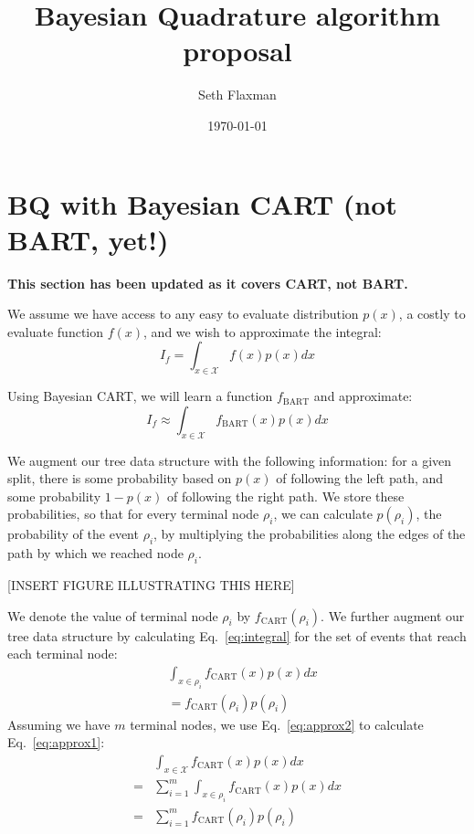\documentclass[12pt]{article}
\title{Bayesian Quadrature algorithm proposal}
\date{\today}
\author{Seth Flaxman}
\begin{document}
\maketitle 

\section{BQ with Bayesian CART (not BART, yet!)}
{\bf This section has been updated as it covers CART, not BART.}

We assume we have access to any easy to evaluate distribution $p(x)$, a costly to evaluate function $f(x)$,
and we wish to approximate the integral:
\begin{equation}
	I_f = \int_{x \in \mathcal{X}} f(x) p(x) dx
\label{eq:integral}
\end{equation}

Using Bayesian CART, we will learn a function $f_{\mbox{BART}}$ and approximate:
\begin{equation}
	I_f \approx \int_{x \in \mathcal{X}} f_{\mbox{BART}}(x) p(x) dx
	\label{eq:approx1}
\end{equation}

We augment our tree data structure with the following information: 
for a given split, there is some probability
based on $p(x)$ of following the left path, and some probability $1-p(x)$ of following the right path. We store
these probabilities, so that for every terminal node $\rho_i$, we can calculate $p(\rho_i)$, the probability of the
event $\rho_i$, by multiplying the probabilities along the edges of the path by which we reached node $\rho_i$.

[INSERT FIGURE ILLUSTRATING THIS HERE]

We denote the value of terminal node $\rho_i$ by $f_{\mbox{CART}}(\rho_i)$.
We further augment our tree data structure by calculating Eq.~\eqref{eq:integral} for the set of events that reach
each terminal node:
\begin{align}
	& \int_{x \in \rho_i} f_{\mbox{CART}}(x) p(x) dx \\
	&=  f_{\mbox{CART}}(\rho_i) p(\rho_i)
	\label{eq:approx2}
\end{align}
Assuming we have $m$ terminal nodes, we use Eq.~\eqref{eq:approx2} to calculate Eq.~\eqref{eq:approx1}:
\begin{align}
	& \int_{x \in \mathcal{X}} f_{\mbox{CART}}(x) p(x) dx \\ 
	= & \sum_{i=1}^m \int_{x \in \rho_i} f_{\mbox{CART}}(x) p(x) dx \\ 
	= &  \sum_{i=1}^m f_{\mbox{CART}}(\rho_i) p(\rho_i)
\end{align}
\end{document}
